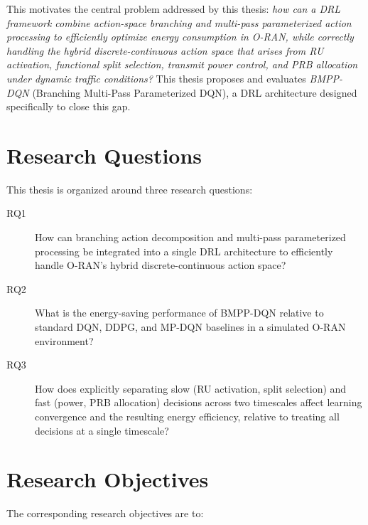 This motivates the central problem addressed by this thesis: \emph{how can a
DRL framework combine action-space branching and multi-pass parameterized
action processing to efficiently optimize energy consumption in O-RAN, while
correctly handling the hybrid discrete-continuous action space that arises
from RU activation, functional split selection, transmit power control, and
PRB allocation under dynamic traffic conditions?} This thesis proposes and
evaluates \emph{BMPP-DQN} (Branching Multi-Pass Parameterized DQN), a DRL
architecture designed specifically to close this gap.

\section{Research Questions}
\label{sec:oran-research-questions}

This thesis is organized around three research questions:

\begin{description}
  \item[RQ1] How can branching action decomposition and multi-pass
    parameterized processing be integrated into a single DRL architecture
    to efficiently handle O-RAN's hybrid discrete-continuous action space?
  \item[RQ2] What is the energy-saving performance of BMPP-DQN relative to
    standard DQN, DDPG, and MP-DQN baselines in a simulated O-RAN
    environment?
  \item[RQ3] How does explicitly separating slow (RU activation, split
    selection) and fast (power, PRB allocation) decisions across two
    timescales affect learning convergence and the resulting energy
    efficiency, relative to treating all decisions at a single timescale?
\end{description}

\section{Research Objectives}
\label{sec:oran-objectives}

The corresponding research objectives are to:

